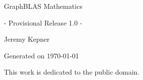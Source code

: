 
  \begin{titlepage}

    \begin{adjustwidth}{-0.75in}{0in}
    \begin{center}
      \Huge
      GraphBLAS Mathematics
      
      - Provisional Release 1.0 -

      \vspace{0.5in}\textsf{}\vspace{-0.7in}
      \normalsize

      \vspace{1.0in}

      Jeremy Kepner
      
      \vspace{0.5in}
      
      Generated on \today
      

    \vspace{3.5in}

This work is dedicated to the public domain.
    \end{center}
    \end{adjustwidth}

  \end{titlepage}




